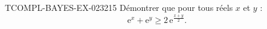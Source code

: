 \begin{exercice}{TCOMPL-BAYES-EX-023}{2}{15}
Démontrer que pour tous réels $x$ et $y$ :
\[ \mathrm{e}^x + \mathrm{e}^y \geq 2\,\mathrm{e}^{\frac{x+y}{2}}. \]

\end{exercice}
